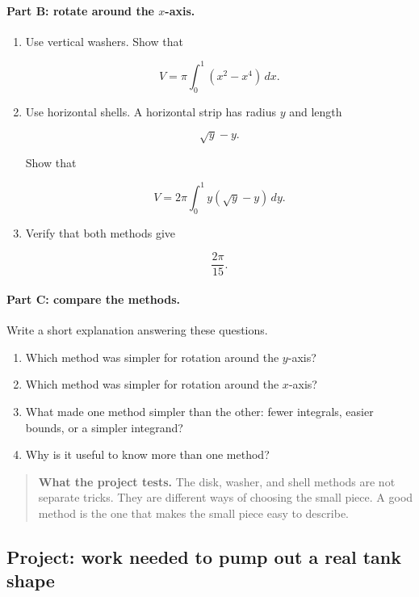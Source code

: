 \paragraph{Part B: rotate around the \(x\)-axis.}

\begin{enumerate}
\item Use vertical washers.  Show that

\[
V=\pi\int_0^1 (x^2-x^4)\,dx.
\]

\item Use horizontal shells.  A horizontal strip has radius \(y\) and length

\[
\sqrt y-y.
\]

Show that

\[
V=2\pi\int_0^1 y(\sqrt y-y)\,dy.
\]

\item Verify that both methods give

\[
\boxed{\frac{2\pi}{15}}.
\]
\end{enumerate}

\paragraph{Part C: compare the methods.}

Write a short explanation answering these questions.

\begin{enumerate}
\item Which method was simpler for rotation around the \(y\)-axis?
\item Which method was simpler for rotation around the \(x\)-axis?
\item What made one method simpler than the other: fewer integrals, easier bounds, or a
simpler integrand?
\item Why is it useful to know more than one method?
\end{enumerate}

\begin{quote}
\textbf{What the project tests.}
The disk, washer, and shell methods are not separate tricks.  They are different ways of
choosing the small piece.  A good method is the one that makes the small piece easy to
describe.
\end{quote}

\subsection{Project: work needed to pump out a real tank shape}
\label{subsec:project-pump-real-tank-shape}

